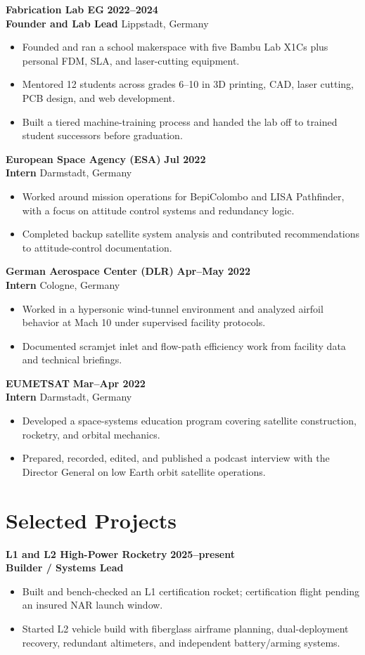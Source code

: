 \documentclass[10pt,letterpaper]{article}
\newcommand{\role}[4]{
  \textbf{#1} \hfill {\color{muted}\textbf{#4}}\\
  {\color{accent}\textbf{#2}} \hfill {\color{muted}#3}
  \vspace{2pt}
}
\newcommand{\project}[4]{
  \textbf{#1} \hfill {\color{muted}\textbf{#4}}\\
  {\color{accent}\textbf{#2}} \hfill {\color{muted}#3}
  \vspace{2pt}
}
\begin{document}
\role{Fabrication Lab EG}{Founder and Lab Lead}{Lippstadt, Germany}{2022--2024}
\begin{itemize}
  \item Founded and ran a school makerspace with five Bambu Lab X1Cs plus personal FDM, SLA, and laser-cutting equipment.
  \item Mentored 12 students across grades 6--10 in 3D printing, CAD, laser cutting, PCB design, and web development.
  \item Built a tiered machine-training process and handed the lab off to trained student successors before graduation.
\end{itemize}

\role{European Space Agency (ESA)}{Intern}{Darmstadt, Germany}{Jul 2022}
\begin{itemize}
  \item Worked around mission operations for BepiColombo and LISA Pathfinder, with a focus on attitude control systems and redundancy logic.
  \item Completed backup satellite system analysis and contributed recommendations to attitude-control documentation.
\end{itemize}

\role{German Aerospace Center (DLR)}{Intern}{Cologne, Germany}{Apr--May 2022}
\begin{itemize}
  \item Worked in a hypersonic wind-tunnel environment and analyzed airfoil behavior at Mach 10 under supervised facility protocols.
  \item Documented scramjet inlet and flow-path efficiency work from facility data and technical briefings.
\end{itemize}

\role{EUMETSAT}{Intern}{Darmstadt, Germany}{Mar--Apr 2022}
\begin{itemize}
  \item Developed a space-systems education program covering satellite construction, rocketry, and orbital mechanics.
  \item Prepared, recorded, edited, and published a podcast interview with the Director General on low Earth orbit satellite operations.
\end{itemize}

\section{Selected Projects}
\project{L1 and L2 High-Power Rocketry}{Builder / Systems Lead}{}{2025--present}
\begin{itemize}
  \item Built and bench-checked an L1 certification rocket; certification flight pending an insured NAR launch window.
  \item Started L2 vehicle build with fiberglass airframe planning, dual-deployment recovery, redundant altimeters, and independent battery/arming systems.
\end{itemize}
\end{document}
